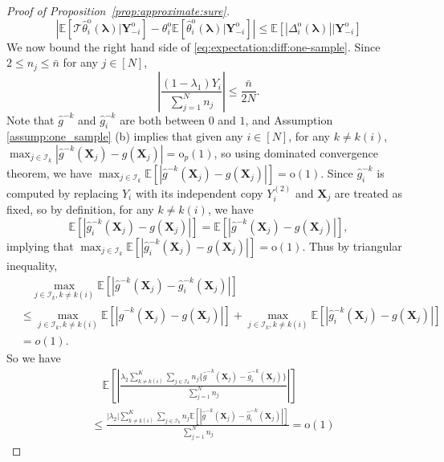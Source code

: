 \documentclass[12pt,letterpaper]{article}
\begin{document}
\begin{proof}[Proof of Proposition~\ref{prop:approximate:sure}]
\begin{equation}\label{eq:expectation:diff:one-sample}
    \left|\mathbb{E}\left[\mathcal{T}\hat{\theta}_i^{\mathrm{o}}(\boldsymbol{\lambda})\big|\mathbf{Y}_{-i}^{\mathrm{o}}\right]-\theta_i^{\mathrm{o}}\mathbb{E}\left[\hat{\theta}_i^{\mathrm{o}}(\boldsymbol{\lambda})\big|\mathbf{Y}_{-i}^{\mathrm{o}}\right]\right|\leq\mathbb{E}\left[\left|\Delta_i^{\mathrm{o}}(\boldsymbol{\lambda})\right|\big|\mathbf{Y}_{-i}^{\mathrm{o}}\right]
\end{equation}
We now bound the right hand side of \eqref{eq:expectation:diff:one-sample}.
Since $2\leq n_j\leq\bar{n}$ for any $j\in[N]$, 
$$\left|\frac{(1-\lambda_1)Y_i}{\sum_{j=1}^Nn_j}\right|\leq\frac
{\bar{n}}{2N}.$$
Note that $\hat{g}^{-k}$ and $\hat{g}_i^{-k}$ are both between $0$ and $1$, and Assumption \ref{assump:one_sample} (b) implies that given any $i\in[N]$, for any $k\neq k(i)$, $\max_{j\in\mathcal{I}_k}|\hat{g}^{-k}(\mathbf{X}_j)-g(\mathbf{X}_j)|=\mathrm{o}_p(1)$, so using dominated convergence theorem, we have $\max_{j\in\mathcal{I}_k}\mathbb{E}\left[|\hat{g}^{-k}(\mathbf{X}_j)-g(\mathbf{X}_j)|\right]=\mathrm{o}(1)$. Since $\hat{g}_i^{-k}$ is computed by replacing $Y_i$ with its independent copy $Y_i^{(2)}$ and $\mathbf{X}_j$ are treated as fixed, so by definition, for any $k\neq k(i)$, we have  
$$\mathbb{E}\left[|\hat{g}_i^{-k}(\mathbf{X}_j)-g(\mathbf{X}_j)|\right]=\mathbb{E}\left[|\hat{g}^{-k}(\mathbf{X}_j)-g(\mathbf{X}_j)|\right],$$
implying that $\max_{j\in\mathcal{I}_k}\mathbb{E}[|\hat{g}_i^{-k}(\mathbf{X}_j)-g(\mathbf{X}_j)|]=\mathrm{o}(1).$
Thus by triangular inequality,
$$\begin{array}{rl}
&\displaystyle\quad\max_{j\in\mathcal{I}_k, k\neq k(i)}\mathbb{E}\left[|\hat{g}^{-k}(\mathbf{X}_j)-\hat{g}_{i}^{-k}(\mathbf{X}_j)|\right]\\
&\displaystyle\leq\max_{j\in\mathcal{I}_k, k\neq k(i)}\mathbb{E}\left[|\hat{g}^{-k}(\mathbf{X}_j)-g(\mathbf{X}_j)|\right]+\max_{j\in\mathcal{I}_k, k\neq k(i)}\mathbb{E}\left[|\hat{g}_i^{-k}(\mathbf{X}_j)-g(\mathbf{X}_j)|\right]\\
&\displaystyle=o(1).
\end{array}$$ 
So we have 
$$\begin{array}{rl}
&\displaystyle\quad\mathbb{E}\left[\left|\frac{\lambda_2\sum_{k\neq k(i)}^K\sum_{j\in\mathcal{I}_k}n_j\{\hat{g}^{-k}(\mathbf{X}_j)-\hat{g}_{i}^{-k}(\mathbf{X}_j)\}}{\sum_{j=1}^Nn_j}\right|\right]\\
&\displaystyle\leq\frac{|\lambda_2|\sum_{k\neq k(i)}^K\sum_{j\in\mathcal{I}_k}n_j\mathbb{E}[|\hat{g}^{-k}(\mathbf{X}_j)-\hat{g}_{i}^{-k}(\mathbf{X}_j)|]}{\sum_{j=1}^Nn_j}=\mathrm{o}(1)

\end{array}$$
\end{proof}
\end{document}
